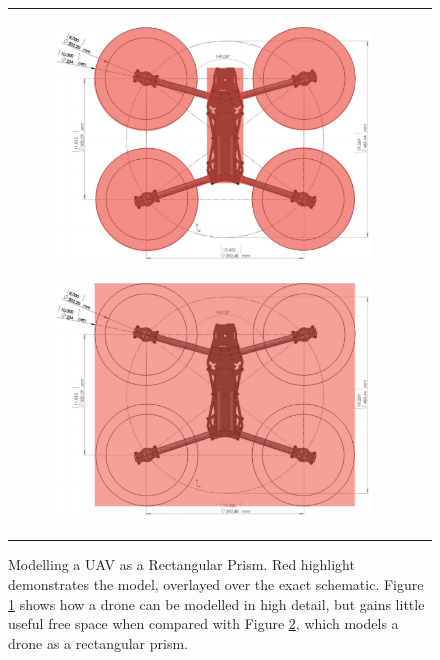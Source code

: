 
\begin{figure}[H]
\begin{centering}

\begin{tabular}{cc}
\begin{subfigure}{0.45\linewidth}
    \includegraphics[width=\linewidth]{appendices/rrt/img/DroneNegSpace.png}
    \caption{}
    \label{subfig:dronenegspace}
\end{subfigure}
\begin{subfigure}{0.45\linewidth}
    \includegraphics[width=\linewidth]{appendices/rrt/img/DroneRecPrism.png}
    \caption{}
    \label{subfig:dronerecprism}
\end{subfigure}
\end{tabular}
\caption[Modelling a UAV as a Rectangular Prism]{Modelling a \gls{UAV} as a Rectangular Prism. Red highlight demonstrates the model, overlayed over the exact schematic. Figure \ref{subfig:dronenegspace} shows how a drone can be modelled in high detail, but gains little useful free space when compared with Figure \ref{subfig:dronerecprism}, which models a drone as a rectangular prism.\cite{Thingbits}}
\label{fig:dronemodelling}
\end{centering}
\end{figure}